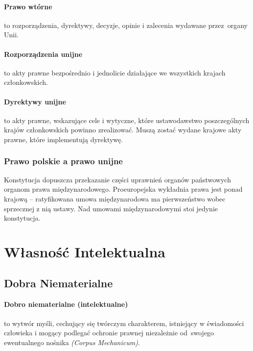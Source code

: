 \documentclass{article}
\begin{document}
\paragraph{Prawo wtórne}
to rozporządzenia, dyrektywy, decyzje, opinie i zalecenia wydawane przez~organy Unii.

\paragraph{Rozporządzenia unijne} to akty prawne
bezpośrednio i jednolicie działające we wszystkich krajach członkowskich.

\paragraph{Dyrektywy unijne} to akty prawne,
wskazujące cele i wytyczne, które ustawodawstwo poszczególnych krajów członkowskich powinno zrealizować.
Muszą zostać wydane krajowe akty prawne, które implementują dyrektywę.

\subsubsection{Prawo polskie a prawo unijne}
Konstytucja dopuszcza przekazanie części uprawnień organów państwowych organom prawa międzynarodowego.
Proeuropejska wykładnia prawa jest ponad krajową --
ratyfikowana umowa międzynarodowa ma pierwszeństwo wobec sprzecznej z nią ustawy.
Nad umowami międzynarodowymi stoi jedynie konstytucja.

\newpage

\section{Własność Intelektualna}

\subsection{Dobra Niematerialne}

\paragraph{Dobro niematerialne (intelektualne)}

to wytwór myśli, cechujący się twórczym charakterem, istniejący w świadomości człowieka
i mogący podlegać ochronie prawnej niezależnie od~swojego ewentualnego nośnika \textit{(Corpus Mechanicum)}.
\end{document}
